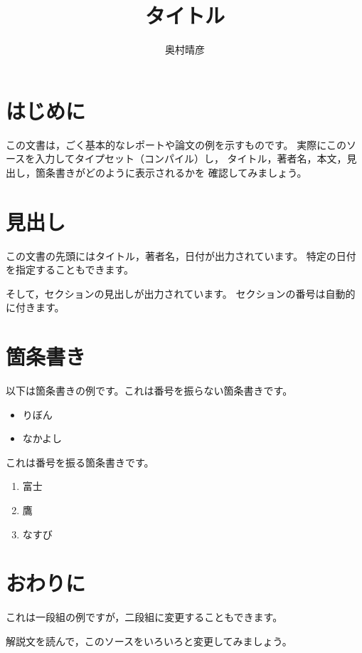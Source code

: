 \documentclass{jsarticle}
\begin{document}
\title{タイトル}
\author{奥村晴彦}
\maketitle

\section{はじめに}

この文書は，ごく基本的なレポートや論文の例を示すものです。
実際にこのソースを入力してタイプセット（コンパイル）し，
タイトル，著者名，本文，見出し，箇条書きがどのように表示されるかを
確認してみましょう。

\section{見出し}

この文書の先頭にはタイトル，著者名，日付が出力されています。
特定の日付を指定することもできます。

そして，セクションの見出しが出力されています。
セクションの番号は自動的に付きます。

\section{箇条書き}

以下は箇条書きの例です。これは番号を振らない箇条書きです。

\begin{itemize}
  \item りぼん
  \item なかよし
\end{itemize}

これは番号を振る箇条書きです。

\begin{enumerate}
  \item 富士
  \item 鷹
  \item なすび
\end{enumerate}

\section{おわりに}

これは一段組の例ですが，二段組に変更することもできます。

解説文を読んで，このソースをいろいろと変更してみましょう。
\end{document}
